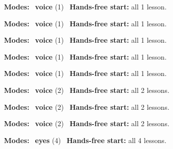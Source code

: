 \expandafter\def\csname hlchaptermodality23\endcsname{%
  {\small\noindent
    \textbf{Modes:} \hlvoicesign{}~\textbf{voice} (1)\quad
    \hlvoicesign{}~\textbf{Hands-free start:} all 1 lesson.%
    \par}\medskip
}

\expandafter\def\csname hlchaptermodality24\endcsname{%
  {\small\noindent
    \textbf{Modes:} \hlvoicesign{}~\textbf{voice} (1)\quad
    \hlvoicesign{}~\textbf{Hands-free start:} all 1 lesson.%
    \par}\medskip
}

\expandafter\def\csname hlchaptermodality25\endcsname{%
  {\small\noindent
    \textbf{Modes:} \hlvoicesign{}~\textbf{voice} (1)\quad
    \hlvoicesign{}~\textbf{Hands-free start:} all 1 lesson.%
    \par}\medskip
}

\expandafter\def\csname hlchaptermodality26\endcsname{%
  {\small\noindent
    \textbf{Modes:} \hlvoicesign{}~\textbf{voice} (1)\quad
    \hlvoicesign{}~\textbf{Hands-free start:} all 1 lesson.%
    \par}\medskip
}

\expandafter\def\csname hlchaptermodality27\endcsname{%
  {\small\noindent
    \textbf{Modes:} \hlvoicesign{}~\textbf{voice} (1)\quad
    \hlvoicesign{}~\textbf{Hands-free start:} all 1 lesson.%
    \par}\medskip
}

\expandafter\def\csname hlchaptermodality28\endcsname{%
  {\small\noindent
    \textbf{Modes:} \hlvoicesign{}~\textbf{voice} (2)\quad
    \hlvoicesign{}~\textbf{Hands-free start:} all 2 lessons.%
    \par}\medskip
}

\expandafter\def\csname hlchaptermodality29\endcsname{%
  {\small\noindent
    \textbf{Modes:} \hlvoicesign{}~\textbf{voice} (2)\quad
    \hlvoicesign{}~\textbf{Hands-free start:} all 2 lessons.%
    \par}\medskip
}

\expandafter\def\csname hlchaptermodality30\endcsname{%
  {\small\noindent
    \textbf{Modes:} \hlvoicesign{}~\textbf{voice} (2)\quad
    \hlvoicesign{}~\textbf{Hands-free start:} all 2 lessons.%
    \par}\medskip
}

\expandafter\def\csname hlchaptermodality31\endcsname{%
  {\small\noindent
    \textbf{Modes:} \hlsightsign{}~\textbf{eyes} (4)\quad
    \hlvoicesign{}~\textbf{Hands-free start:} all 4 lessons.%
    \par}\medskip
}

